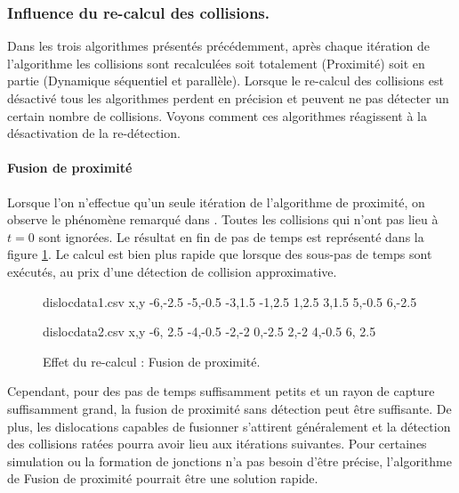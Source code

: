 \documentclass[11pt,class=article,float=false,crop=false]{standalone}
\begin{document}
\subsubsection{Influence du re-calcul des collisions.}

Dans les trois algorithmes présentés précédemment, après chaque itération de l'algorithme les collisions sont recalculées soit totalement (Proximité) soit en partie (Dynamique séquentiel et parallèle). Lorsque le re-calcul des collisions est désactivé tous les algorithmes perdent en précision et peuvent ne pas détecter un certain nombre de collisions. Voyons comment ces algorithmes réagissent à la désactivation de la re-détection.

\paragraph{Fusion de proximité}

Lorsque l'on n'effectue qu'un seule itération de l'algorithme de proximité, on observe le phénomène remarqué dans . Toutes les collisions qui n'ont pas lieu à $t=0$ sont ignorées. Le résultat en fin de pas de temps est représenté dans la figure \ref{fig:frankread_noredetect_proximite}. Le calcul est bien plus rapide que lorsque des sous-pas de temps sont exécutés, au prix d'une détection de collision approximative. 

\begin{figure}[H]
	\centering
	\begin{filecontents*}{dislocdata1.csv}
		x,y
		-6,-2.5
		-5,-0.5
		-3,1.5
		-1,2.5
		 1,2.5
		 3,1.5
		 5,-0.5
		 6,-2.5
	\end{filecontents*}
	\begin{filecontents*}{dislocdata2.csv}
		x,y
		-6, 2.5
		-4,-0.5
		-2,-2
		 0,-2.5
		 2,-2
		 4,-0.5
		 6, 2.5
	\end{filecontents*}
	\caption{Effet du re-calcul : Fusion de proximité.}
	\label{fig:frankread_noredetect_proximite}
\end{figure}

Cependant, pour des pas de temps suffisamment petits et un rayon de capture suffisamment grand, la fusion de proximité sans détection peut être suffisante. De plus, les dislocations capables de fusionner s'attirent généralement et la détection des collisions ratées pourra avoir lieu aux itérations suivantes. Pour certaines simulation ou la formation de jonctions n'a pas besoin d'être précise, l'algorithme de Fusion de proximité pourrait être une solution rapide.
\end{document}
